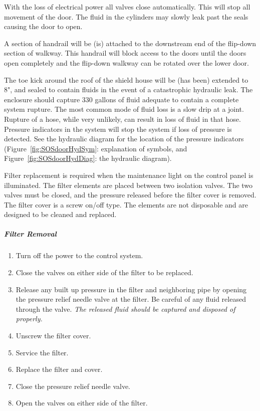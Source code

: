 With the loss of electrical power all valves close automatically. This will
stop all movement of the door. The fluid in the cylinders may slowly leak
past the seals causing the door to open.

A section of handrail will be (is) attached to the downstream end of the
flip-down section of walkway. This handrail will block access to the doors
until the doors open completely and the flip-down walkway can be rotated
over the lower door.

The toe kick around the roof of the shield house will be (has been)
extended to 8", and sealed to contain fluids in the event of a catastrophic
hydraulic leak. The enclosure should capture 330 gallons of fluid adequate
to contain a complete system rupture.  The most common mode of fluid
loss is a slow drip at a joint. Rupture of a hose, while very unlikely, can
result in loss of fluid in that hose. Pressure indicators in the system
will stop
the system if loss of pressure is detected. See the hydraulic diagram for
the location of the pressure indicators (Figure~\ref{fig:SOSdoorHydSym}: explanation of symbols,
and Figure~\ref{fig:SOSdoorHydDiag}: the hydraulic diagram).

Filter replacement is required when the maintenance light on the control
panel is illuminated. The filter elements are placed between two isolation
valves. The two valves must be closed, and the pressure released before
the filter cover is removed. The filter cover is a screw on/off type. The
elements are not disposable and are designed to be cleaned and replaced.

\subparagraph{Filter Removal}

\begin{enumerate}
\item{Turn off the power to the control system.}
\item{Close the valves on either side of the filter to be replaced.}
\item{Release any built up pressure in the filter and neighboring pipe by
opening the pressure relief needle valve at the filter. Be careful of any fluid
released through the valve. {\sl The released fluid should be captured and
disposed of properly.}}
\item{Unscrew the filter cover.}
\item{Service the filter.}
\item{Replace the filter and cover.}
\item{Close the pressure relief needle valve.}
\item{Open the valves on either side of the filter.}
\end{enumerate}

